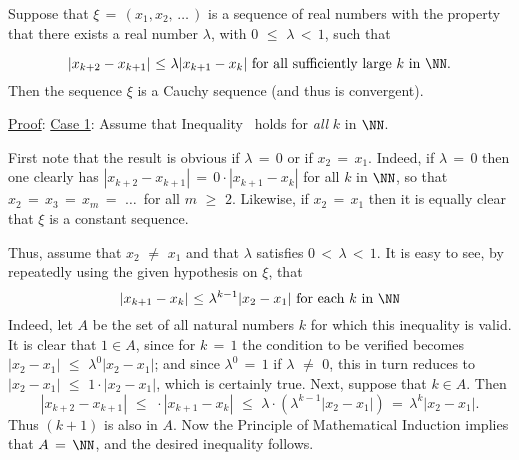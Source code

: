 \V

        Suppose that ${\xi} \,=\, (x_{1},x_{2},\,{\ldots}\,)$ is a sequence of real numbers with the property that there exists a real number ${\lambda}$,
    with $0\,\,{\leq}\,\,{\lambda}\,<\,1$, such that

        \begin{equation}
        \label{IneqC.110}
        |x_{k+2}-x_{k+1}|\,\,{\leq}\,\,{\lambda}|x_{k+1}-x_{k}| \mbox{ for all sufficiently large $k$ in ${\NN}$}.
        \end{equation}
    Then the sequence ${\xi}$ is a Cauchy sequence (and thus is convergent).


\V

        \underline{Proof}: \underline{Case 1}: Assume that Inequality~ holds for {\em all} $k$ in ${\NN}$.

        First note that the result is obvious if ${\lambda} \,=\, 0$ or if $x_{2} \,=\, x_{1}$.
    Indeed, if ${\lambda} \,=\, 0$ then one clearly has $|x_{k+2}-x_{k+1}| \,=\, 0{\cdot}|x_{k+1}-x_{k}|$ for all $k$ in ${\NN}$,
    so that $x_{2} \,=\, x_{3} \,=\, x_{m} \,=\, \,{\ldots}\,$ for all $m\,\,{\geq}\,\,2$.
    Likewise, if $x_{2} \,=\, x_{1}$ then it is equally clear that ${\xi}$ is a constant sequence.

        Thus, assume that $x_{2} \,\,{\neq}\,\, x_{1}$ and that ${\lambda}$ satisfies $0\,<\,{\lambda}\,<\,1$.
    It is easy to see, by repeatedly using the given hypothesis on ${\xi}$, that
        \begin{displaymath}
        |x_{k+1}-x_{k}|\,\,{\leq}\,\,{\lambda}^{k-1}|x_{2}-x_{1}| \mbox{ for each $k$ in ${\NN}$}
        \end{displaymath}
    Indeed, let $A$ be the set of all natural numbers $k$ for which this inequality is valid.
    It is clear that $1{\in}A$, since for $k \,=\, 1$ the condition to be verified becomes
        $|x_{2}-x_{1}|\,\,{\leq}\,\,{\lambda}^{0}|x_{2}-x_{1}|$; and since ${\lambda}^{0} \,=\, 1$ if ${\lambda} \,\,{\neq}\,\, 0$,
    this in turn reduces to $|x_{2}-x_{1}|\,\,{\leq}\,\,1{\cdot}|x_{2}-x_{1}|$, which is certainly true.
    Next, suppose that $k{\in}A$. Then
        \begin{displaymath}
        |x_{k+2}-x_{k+1}|\,\,{\leq}\,\,{\cdot}|x_{k+1}-x_{k}|\,\,{\leq}\,\,{\lambda}{\cdot}\left({\lambda}^{k-1}|x_{2}-x_{1}|\right)
     \,=\, {\lambda}^{k}|x_{2}-x_{1}|.
        \end{displaymath}
    Thus $(k+1)$ is also in $A$.
    Now the Principle of Mathematical Induction implies that $A \,=\, {\NN}$, and the desired inequality follows.

